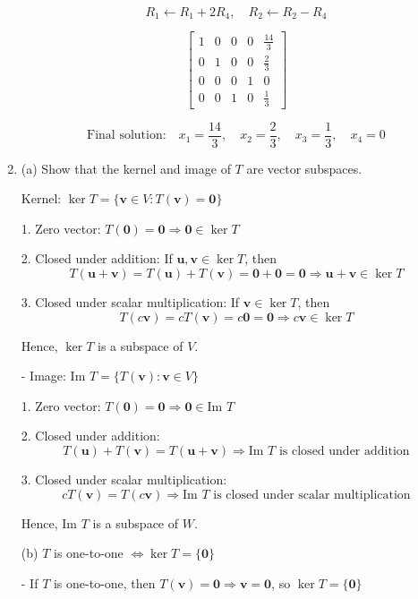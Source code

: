 \documentclass[12pt]{article}
\begin{document}
\begin{enumerate}
\[
R_1 \leftarrow R_1 + 2R_4,\quad
R_2 \leftarrow R_2 - R_4
\]

\[
\left[
\begin{array}{rrrr|r}
1 & 0 & 0 & 0 & \frac{14}{3} \\
0 & 1 & 0 & 0 & \frac{2}{3} \\
0 & 0 & 0 & 1 & 0 \\
0 & 0 & 1 & 0 & \frac{1}{3}
\end{array}
\right]
\]

\[
\text{Final solution:} \quad
x_1 = \frac{14}{3},\quad
x_2 = \frac{2}{3},\quad
x_3 = \frac{1}{3},\quad
x_4 = 0
\]

\item 

(a) Show that the kernel and image of \( T \) are vector subspaces.

Kernel: \( \ker T = \{ \mathbf{v} \in V : T(\mathbf{v}) = \mathbf{0} \} \)

  1. Zero vector: \( T(\mathbf{0}) = \mathbf{0} \Rightarrow \mathbf{0} \in \ker T \)

  2. Closed under addition: If \( \mathbf{u}, \mathbf{v} \in \ker T \), then
     \[
     T(\mathbf{u} + \mathbf{v}) = T(\mathbf{u}) + T(\mathbf{v}) = \mathbf{0} + \mathbf{0} = \mathbf{0}
     \Rightarrow \mathbf{u} + \mathbf{v} \in \ker T
     \]

  3. Closed under scalar multiplication: If \( \mathbf{v} \in \ker T \), then
     \[
     T(c\mathbf{v}) = cT(\mathbf{v}) = c\mathbf{0} = \mathbf{0}
     \Rightarrow c\mathbf{v} \in \ker T
     \]

  Hence, \( \ker T \) is a subspace of \( V \).

- Image: \( \text{Im } T = \{ T(\mathbf{v}) : \mathbf{v} \in V \} \)

  1. Zero vector: \( T(\mathbf{0}) = \mathbf{0} \Rightarrow \mathbf{0} \in \text{Im } T \)

  2. Closed under addition:
     \[
     T(\mathbf{u}) + T(\mathbf{v}) = T(\mathbf{u} + \mathbf{v}) \Rightarrow \text{Im } T \text{ is closed under addition}
     \]

  3. Closed under scalar multiplication:
     \[
     cT(\mathbf{v}) = T(c\mathbf{v}) \Rightarrow \text{Im } T \text{ is closed under scalar multiplication}
     \]

  Hence, \( \text{Im } T \) is a subspace of \( W \).

(b) \( T \) is one-to-one \( \Leftrightarrow \ker T = \{ \mathbf{0} \} \)

-  If \( T \) is one-to-one, then \( T(\mathbf{v}) = \mathbf{0} \Rightarrow \mathbf{v} = \mathbf{0} \), so \( \ker T = \{ \mathbf{0} \} \)


\end{enumerate}
\end{document}
